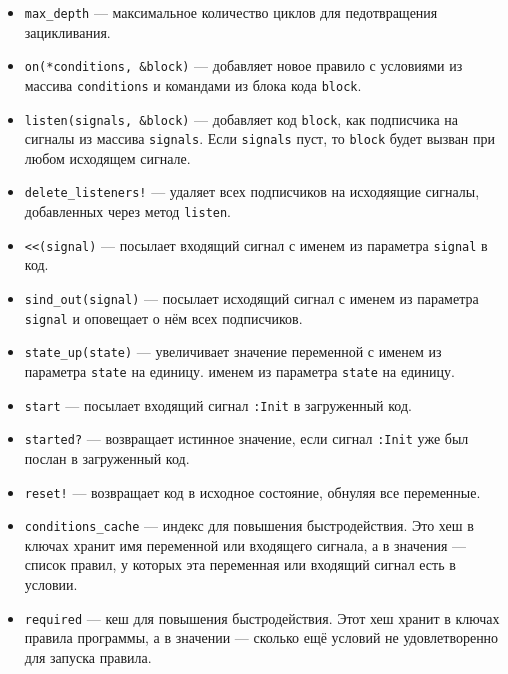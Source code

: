 \documentclass[utf8,a5paper,portrait,10pt]{eskdtext}
\begin{document}
\begin{itemize}
\begin{itemize}
          \item \texttt{max\_depth} — максимальное количество циклов для
                педотвращения зацикливания.
          \item \texttt{on(*conditions, \&block)} — добавляет новое правило
                с условиями из массива \texttt{conditions} и командами из блока
                кода \texttt{block}.
          \item \texttt{listen(signals, \&block)} — добавляет код
                \texttt{block}, как подписчика на сигналы из массива
                \texttt{signals}. Если \texttt{signals} пуст, то \texttt{block}
                будет вызван при любом исходящем сигнале.
          \item \texttt{delete\_listeners!} — удаляет всех подписчиков на
                исходяящие сигналы, добавленных через метод \texttt{listen}.
          \item \texttt{<<(signal)} — посылает входящий сигнал с именем
                из параметра \texttt{signal} в код.
          \item \texttt{sind\_out(signal)} — посылает исходящий сигнал с именем
                из параметра \texttt{signal} и оповещает о нём всех подписчиков.
          \item \texttt{state\_up(state)} — увеличивает значение переменной с
                именем из параметра \texttt{state} на единицу.
                именем из параметра \texttt{state} на единицу.
          \item \texttt{start} — посылает входящий сигнал \texttt{:Init} в
                загруженный код.
          \item \texttt{started?} — возвращает истинное значение, если сигнал
                \texttt{:Init} уже был послан в загруженный код.
          \item \texttt{reset!} — возвращает код в исходное состояние, обнуляя
                все переменные.
          \item \texttt{conditions\_cache} — индекс для повышения
                быстродействия. Это хеш в ключах хранит имя переменной или
                входящего сигнала, а в значения — список правил, у которых эта
                переменная или входящий сигнал есть в условии.
          \item \texttt{required} — кеш для повышения быстродействия. Этот хеш
                хранит в ключах правила программы, а в значении — сколько ещё
                условий не удовлетворенно для запуска правила.
        \end{itemize}

\end{itemize}
\end{document}
